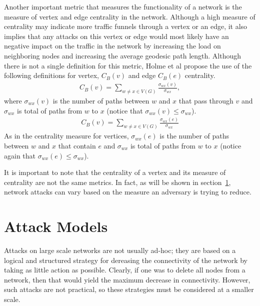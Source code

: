 \documentclass[11pt]{article}
\begin{document}
Another important metric that measures the functionality of a network is the measure of vertex and edge centrality in the network. Although a high measure of centrality may indicate more traffic funnels through a vertex or an edge, it also implies that any attacks on this vertex or edge would most likely have an negative impact on the traffic in the network by increasing the load on neighboring nodes and increasing the average geodesic path length. Although there is not a single definition for this metric, Holme et al \cite{Attacks} propose the use of the following definitions for vertex, $C_{B}(v)$ and edge $C_{B}(e)$ centrality.
\begin{eqnarray*}
C_{B}(v) = \sum_{w \not= x \in V(G)} \frac{\sigma_{wx}(v)}{\sigma_{wx}},
\end{eqnarray*}
where $\sigma_{wx}(v)$ is the number of paths between $w$ and $x$ that pass through $v$ and $\sigma_{wx}$ is total of paths from $w$ to $x$ (notice that $\sigma_{wx}(v) \leq \sigma_{wx}$).
\begin{eqnarray*}
C_{B}(v) = \sum_{w \not= x \in V(G)} \frac{\sigma_{wx}(e)}{\sigma_{wx}}
\end{eqnarray*}
As in the centrality measure for vertices, $\sigma_{wx}(e)$ is the number of paths between $w$ and $x$ that contain $e$ and $\sigma_{wx}$ is total of paths from $w$ to $x$ (notice again that $\sigma_{wx}(e) \leq \sigma_{wx}$).

It is important to note that the centrality of a vertex and its measure of centrality are not the same metrics. In fact, as will be shown in section~\ref{AttackStrategies}, network attacks can vary based on the measure an adversary is trying to reduce. 




\section{Attack Models}
\label{AttackStrategies}
Attacks on large scale networks are not usually ad-hoc; they are based on a logical and structured strategy for dereasing the connectivity of the network by taking as little action as possible. Clearly, if one was to delete all nodes from a network, then that would yield the maximum decrease in connectivity. However, such attacks are not practical, so these strategies must be considered at a smaller scale. 
\end{document}
